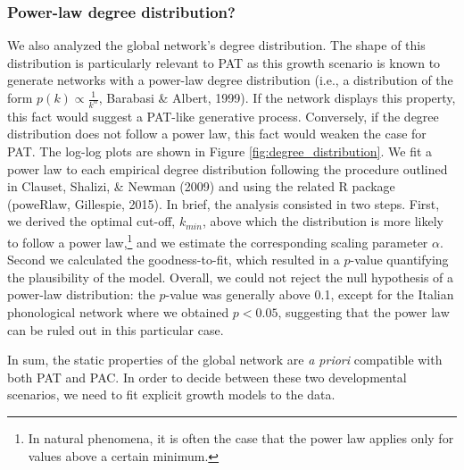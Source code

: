 \documentclass[10pt, letterpaper]{article}
\begin{document}
\subsubsection{Power-law degree
distribution?}\label{power-law-degree-distribution}

We also analyzed the global network's degree distribution. The shape of
this distribution is particularly relevant to PAT as this growth
scenario is known to generate networks with a power-law degree
distribution (i.e., a distribution of the form
\(p(k) \propto \frac{1}{k^{\alpha}}\), Barabasi \& Albert, 1999). If the
network displays this property, this fact would suggest a PAT-like
generative process. Conversely, if the degree distribution does not
follow a power law, this fact would weaken the case for PAT. The log-log
plots are shown in Figure \ref{fig:degree_distribution}. We fit a power
law to each empirical degree distribution following the procedure
outlined in Clauset, Shalizi, \& Newman (2009) and using the related R
package (poweRlaw, Gillespie, 2015). In brief, the analysis consisted in
two steps. First, we derived the optimal cut-off, \(k_{min}\), above
which the distribution is more likely to follow a power
law,\footnote{In natural phenomena, it is often the case that the power law applies only for values above a certain minimum.}
and we estimate the corresponding scaling parameter \(\alpha\). Second
we calculated the goodness-to-fit, which resulted in a \(p\)-value
quantifying the plausibility of the model. Overall, we could not reject
the null hypothesis of a power-law distribution: the \(p\)-value was
generally above 0.1, except for the Italian phonological network where
we obtained \(p < 0.05\), suggesting that the power law can be ruled out
in this particular case.

In sum, the static properties of the global network are \emph{a priori}
compatible with both PAT and PAC. In order to decide between these two
developmental scenarios, we need to fit explicit growth models to the
data.
\end{document}
